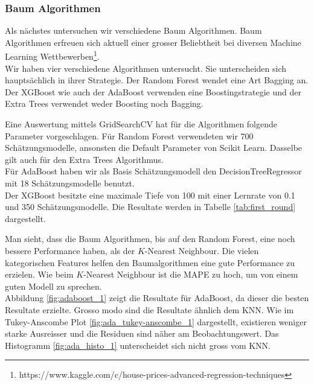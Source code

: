 \subsubsection{Baum Algorithmen}
Als nächstes untersuchen wir verschiedene Baum Algorithmen. Baum Algorithmen erfreuen sich aktuell einer grosser Beliebtheit bei diversen Machine Learning Wettbewerben\footnote{https://www.kaggle.com/c/house-prices-advanced-regression-techniques}.\\[2ex]
%
Wir haben vier verschiedene Algorithmen untersucht. Sie unterscheiden sich hauptsächlich in ihrer Strategie. Der Random Forest wendet eine Art Bagging an. Der XGBoost wie auch der AdaBoost verwenden eine Boostingstrategie und der Extra Trees verwendet weder Boosting noch Bagging.

Eine Auswertung mittels GridSearchCV hat für die Algorithmen folgende Parameter vorgeschlagen.
Für Random Forest verwendeten wir 700 Schätzungsmodelle, ansonsten die Default Parameter von Scikit Learn. Dasselbe gilt auch für den Extra Trees Algorithmus.\\
Für AdaBoost haben wir als Basis Schätzungsmodell den DecisionTreeRegressor mit 18 Schätzungsmodelle benutzt.\\
Der XGBoost besitzte eine maximale Tiefe von 100 mit einer Lernrate von 0.1 und 350 Schätzungsmodelle.
Die Resultate werden in Tabelle \ref{tab:first_round} dargestellt.

\begin{table}[ht]
\centering
{}
\caption{Ergebnisse der Baum Algorithmen}
\label{tab:first_round}
\end{table}

Man sieht, dass die Baum Algorithmen, bis auf den Random Forest, eine noch bessere Performance haben, als der $K$-Nearest Neighbour. Die vielen kategorischen Features helfen den Baumalgorithmen eine gute Performance zu erzielen. Wie beim $K$-Nearest Neighbour ist die MAPE zu hoch, um von einem guten Modell zu sprechen.\\
Abbildung \ref{fig:adaboost_1} zeigt die Resultate für AdaBoost, da dieser die besten Resultate erzielte. Gros­so mo­do sind die Resultate ähnlich dem KNN. Wie im Tukey-Anscombe Plot \ref{fig:ada_tukey-anscombe_1} dargestellt, existieren weniger starke Ausreisser und die Residuen sind näher am Beobachtungswert. Das Histogramm \ref{fig:ada_histo_1} unterscheidet sich nicht gross vom KNN.

